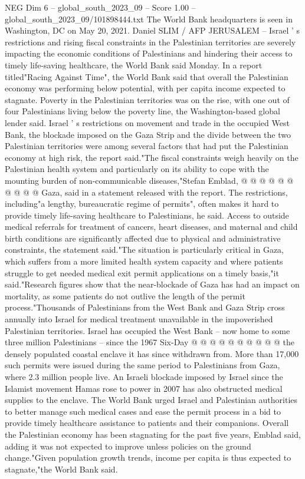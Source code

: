 \begin{textsample}{NEG Dim 6 – global\_south\_2023\_09 – Score 1.00 – global\_south\_2023\_09/101898444.txt}  \label{ex:f6_neg_075}
The World Bank headquarters is seen in Washington, DC on May 20, 2021.
Daniel SLIM / AFP JERUSALEM -- Israel ' s restrictions and rising fiscal constraints in the Palestinian territories are severely impacting the economic conditions of Palestinians and hindering their access to timely life-saving healthcare, the World Bank said Monday.
In a report titled"Racing Against Time", the World Bank said that overall the Palestinian economy was performing below potential, with per capita income expected to stagnate.
Poverty in the Palestinian territories was on the rise, with one out of four Palestinians living below the poverty line, the Washington-based global lender said.
Israel ' s restrictions on movement and trade in the occupied West Bank, the blockade imposed on the Gaza Strip and the divide between the two Palestinian territories were among several factors that had put the Palestinian economy at high risk, the report said."The fiscal constraints weigh heavily on the Palestinian health system and particularly on its ability to cope with the mounting burden of non-communicable diseases,"Stefan Emblad, @ @ @ @ @ @ @ @ @ @ Gaza, said in a statement released with the report.
The restrictions, including"a lengthy, bureaucratic regime of permits", often makes it hard to provide timely life-saving healthcare to Palestinians, he said.
Access to outside medical referrals for treatment of cancers, heart diseases, and maternal and child birth conditions are significantly affected due to physical and administrative constraints, the statement said."The situation is particularly critical in Gaza, which suffers from a more limited health system capacity and where patients struggle to get needed medical exit permit applications on a timely basis,"it said."Research figures show that the near-blockade of Gaza has had an impact on mortality, as some patients do not outlive the length of the permit process."Thousands of Palestinians from the West Bank and Gaza Strip cross annually into Israel for medical treatment unavailable in the impoverished Palestinian territories.
Israel has occupied the West Bank -- now home to some three million Palestinians -- since the 1967 Six-Day @ @ @ @ @ @ @ @ @ @ the densely populated coastal enclave it has since withdrawn from.
More than 17,000 such permits were issued during the same period to Palestinians from Gaza, where 2.3 million people live.
An Israeli blockade imposed by Israel since the Islamist movement Hamas rose to power in 2007 has also obstructed medical supplies to the enclave.
The World Bank urged Israel and Palestinian authorities to better manage such medical cases and ease the permit process in a bid to provide timely healthcare assistance to patients and their companions.
Overall the Palestinian economy has been stagnating for the past five years, Emblad said, adding it was not expected to improve unless policies on the ground change."Given population growth trends, income per capita is thus expected to stagnate,"the World Bank said.

\end{textsample}
